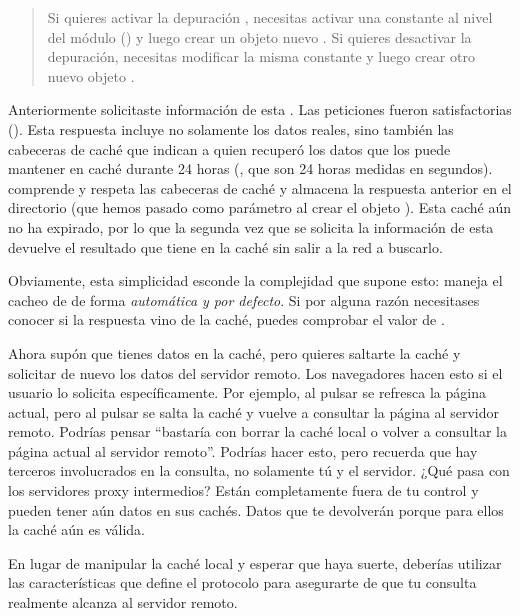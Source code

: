\begin{quote}
Si quieres activar la depuración , necesitas activar una constante al nivel del módulo () y luego crear un objeto nuevo . Si quieres desactivar la depuración, necesitas modificar la misma constante y luego crear otro nuevo objeto .
\end{quote}

Anteriormente solicitaste información de esta . Las peticiones fueron satisfactorias (). Esta respuesta incluye no solamente los datos reales, sino también las cabeceras de caché que indican a quien recuperó los datos que los puede mantener en caché durante 24 horas (, que son 24 horas medidas en segundos).  comprende y respeta las cabeceras de caché y almacena la respuesta anterior en el directorio  (que hemos pasado como parámetro al crear el objeto ). Esta caché aún no ha expirado, por lo que la segunda vez que se solicita la información de esta   devuelve el resultado que tiene en la caché sin salir a la red a buscarlo.

Obviamente, esta simplicidad esconde la complejidad que supone esto:  maneja el cacheo de  de forma \emph{automática y por defecto}. Si por alguna razón necesitases conocer si la respuesta vino de la caché, puedes comprobar el valor de . 

Ahora supón que tienes datos en la caché, pero quieres saltarte la caché y solicitar de nuevo los datos del servidor remoto. Los navegadores hacen esto si el usuario lo solicita específicamente. Por ejemplo, al pulsar  se refresca la página actual, pero al pulsar  se salta la caché y vuelve a consultar la página al servidor remoto. Podrías pensar ``bastaría con borrar la caché local o volver a consultar la página actual al servidor remoto''. Podrías hacer esto, pero recuerda que hay terceros involucrados en la consulta, no solamente tú y el servidor. ¿Qué pasa con los servidores proxy intermedios? Están completamente fuera de tu control y pueden tener aún datos en sus cachés. Datos que te devolverán porque para ellos la caché aún es válida.

En lugar de manipular la caché local y esperar que haya suerte, deberías utilizar las características que define el protocolo  para asegurarte de que tu consulta realmente alcanza al servidor remoto.

